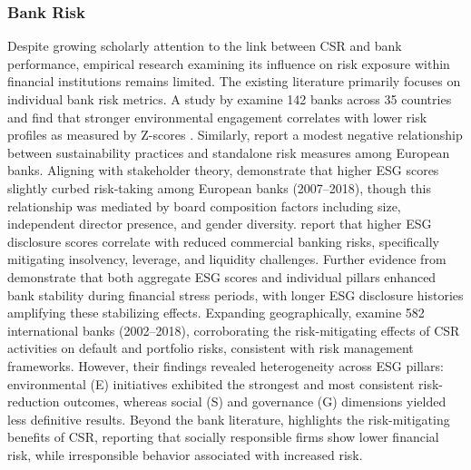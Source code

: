 \documentclass[
  authoryear]{elsarticle}
\begin{document}
\subsubsection{Bank Risk}\label{bank-risk}

Despite growing scholarly attention to the link between CSR and bank
performance, empirical research examining its influence on risk exposure
within financial institutions remains limited. The existing literature
primarily focuses on individual bank risk metrics. A study by
\citet{GANGI2019} examine 142 banks across 35 countries and find that
stronger environmental engagement correlates with lower risk profiles as
measured by Z-scores \citep[see][]{LAEVEN2009}. Similarly,
\citet{SCHOLTENS2019} report a modest negative relationship between
sustainability practices and standalone risk measures among European
banks. Aligning with stakeholder theory, \citet{DI_TOMMASO2020}
demonstrate that higher ESG scores slightly curbed risk-taking among
European banks (2007--2018), though this relationship was mediated by
board composition factors including size, independent director presence,
and gender diversity. \citet{GANGWANI2024} report that higher ESG
disclosure scores correlate with reduced commercial banking risks,
specifically mitigating insolvency, leverage, and liquidity challenges.
Further evidence from \citet{CHIARAMONTE2022} demonstrate that both
aggregate ESG scores and individual pillars enhanced bank stability
during financial stress periods, with longer ESG disclosure histories
amplifying these stabilizing effects. Expanding geographically,
\citet{NEITZERT2022} examine 582 international banks (2002--2018),
corroborating the risk-mitigating effects of CSR activities on default
and portfolio risks, consistent with risk management frameworks.
However, their findings revealed heterogeneity across ESG pillars:
environmental (E) initiatives exhibited the strongest and most
consistent risk-reduction outcomes, whereas social (S) and governance
(G) dimensions yielded less definitive results. Beyond the bank
literature, \citet{OIKONOMOU2012} highlights the risk-mitigating
benefits of CSR, reporting that socially responsible firms show lower
financial risk, while irresponsible behavior associated with increased
risk.
\end{document}

